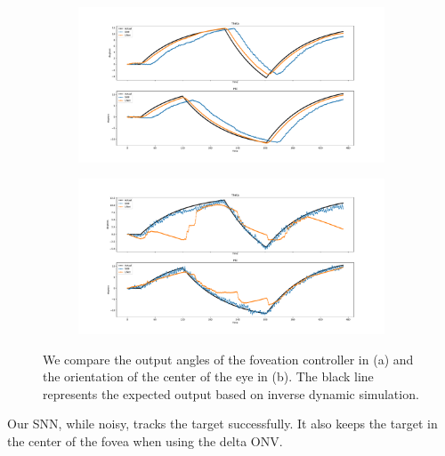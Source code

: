 \documentclass [MS] {UCLAthesis}
\begin{document}
\begin{figure}
    \centering

    \begin{subfigure}[b]{0.8\textwidth}
        \centering
        \includegraphics[width=\textwidth]{smooth_normal}
        \caption{}
        \label{fig:smooth_normal}
    \end{subfigure}

    \begin{subfigure}[b]{0.8\textwidth}
        \centering
        \includegraphics[width=\textwidth]{smooth_delta}
        \caption{}
        \label{fig:smooth_delta}
    \end{subfigure}


    \caption[Smooth pursuit eye orientation with different models]{We compare the output angles of the foveation controller in (a) and the orientation of the center of the eye in (b). The black line represents the expected output based on inverse dynamic simulation.}
    \label{fig:smooth}
\end{figure}

Our SNN, while noisy, tracks the target successfully. It also keeps the target in the center of the fovea when using the delta ONV.
\end{document}
